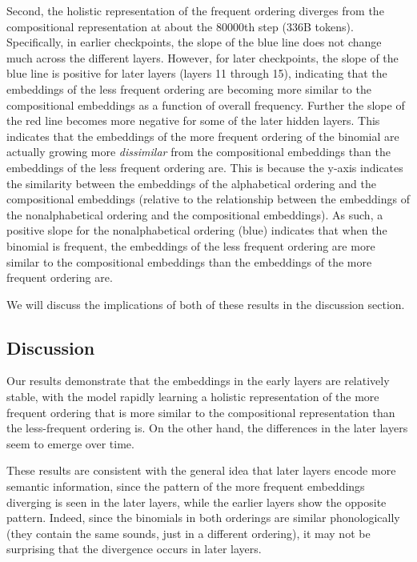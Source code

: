 \documentclass[
  12pt,
  letterpaper,
]{scrreport}
\begin{document}
Second, the holistic representation of the frequent ordering diverges
from the compositional representation at about the 80000th step (336B
tokens). Specifically, in earlier checkpoints, the slope of the blue
line does not change much across the different layers. However, for
later checkpoints, the slope of the blue line is positive for later
layers (layers 11 through 15), indicating that the embeddings of the
less frequent ordering are becoming more similar to the compositional
embeddings as a function of overall frequency. Further the slope of the
red line becomes more negative for some of the later hidden layers. This
indicates that the embeddings of the more frequent ordering of the
binomial are actually growing more \emph{dissimilar} from the
compositional embeddings than the embeddings of the less frequent
ordering are. This is because the y-axis indicates the similarity
between the embeddings of the alphabetical ordering and the
compositional embeddings (relative to the relationship between the
embeddings of the nonalphabetical ordering and the compositional
embeddings). As such, a positive slope for the nonalphabetical ordering
(blue) indicates that when the binomial is frequent, the embeddings of
the less frequent ordering are more similar to the compositional
embeddings than the embeddings of the more frequent ordering are.

We will discuss the implications of both of these results in the
discussion section.

\subsection{Discussion}\label{discussion-9}

Our results demonstrate that the embeddings in the early layers are
relatively stable, with the model rapidly learning a holistic
representation of the more frequent ordering that is more similar to the
compositional representation than the less-frequent ordering is. On the
other hand, the differences in the later layers seem to emerge over
time.

These results are consistent with the general idea that later layers
encode more semantic information, since the pattern of the more frequent
embeddings diverging is seen in the later layers, while the earlier
layers show the opposite pattern. Indeed, since the binomials in both
orderings are similar phonologically (they contain the same sounds, just
in a different ordering), it may not be surprising that the divergence
occurs in later layers.
\end{document}
